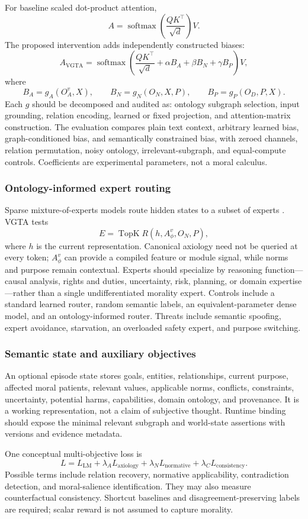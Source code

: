 For baseline scaled dot-product attention,
\[
  A=\operatorname{softmax}\!\left(\frac{QK^\top}{\sqrt d}\right)V.
\]
The proposed intervention adds independently constructed biases:
\[
  A_{\mathrm{VGTA}}=
  \operatorname{softmax}\!\left(
    \frac{QK^\top}{\sqrt d}
    +\alpha B_A+\beta B_N+\gamma B_P
  \right)V,
\]
where
\[
  B_A=g_A(O_A^v,X),\qquad
  B_N=g_N(O_N,X,P),\qquad
  B_P=g_P(O_D,P,X).
\]
Each $g$ should be decomposed and audited as: ontology subgraph selection, input grounding, relation encoding, learned or fixed projection, and attention-matrix construction. The evaluation compares plain text context, arbitrary learned bias, graph-conditioned bias, and semantically constrained bias, with zeroed channels, relation permutation, noisy ontology, irrelevant-subgraph, and equal-compute controls. Coefficients are experimental parameters, not a moral calculus.

\subsubsection{Ontology-informed expert routing}

Sparse mixture-of-experts models route hidden states to a subset of experts \citep{shazeer2017sparsely,fedus2022switch}. VGTA tests
\[
  E=\operatorname{TopK}R(h,A_\phi^v,O_N,P),
\]
where $h$ is the current representation. Canonical axiology need not be queried at every token; $A_\phi^v$ can provide a compiled feature or module signal, while norms and purpose remain contextual. Experts should specialize by reasoning function---causal analysis, rights and duties, uncertainty, risk, planning, or domain expertise---rather than a single undifferentiated morality expert. Controls include a standard learned router, random semantic labels, an equivalent-parameter dense model, and an ontology-informed router. Threats include semantic spoofing, expert avoidance, starvation, an overloaded safety expert, and purpose switching.

\subsubsection{Semantic state and auxiliary objectives}

An optional episode state stores goals, entities, relationships, current purpose, affected moral patients, relevant values, applicable norms, conflicts, constraints, uncertainty, potential harms, capabilities, domain ontology, and provenance. It is a working representation, not a claim of subjective thought. Runtime binding should expose the minimal relevant subgraph and world-state assertions with versions and evidence metadata.

One conceptual multi-objective loss is
\[
  L=L_{\mathrm{LM}}+\lambda_A L_{\mathrm{axiology}}
    +\lambda_N L_{\mathrm{normative}}+\lambda_C L_{\mathrm{consistency}}.
\]
Possible terms include relation recovery, normative applicability, contradiction detection, and moral-salience identification. They may also measure counterfactual consistency. Shortcut baselines and disagreement-preserving labels are required; scalar reward is not assumed to capture morality.
